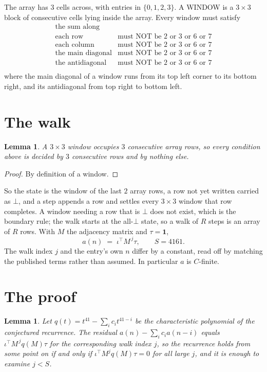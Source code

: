 \documentclass[11pt,a4paper]{article}
\theoremstyle{plain}
\newtheorem{lemma}[theorem]{Lemma}
\theoremstyle{definition}
\begin{document}
The array has $3$ cells across, with entries in $\{0,1,2,3\}$. A WINDOW is a $3\times3$ block
of consecutive cells lying inside the array. Every window must satisfy
\[
\begin{array}{ll}
\text{the sum along} & \text{} \\[2pt]
\text{each row} & \text{must NOT be 2 or 3 or 6 or 7} \\
\text{each column} & \text{must NOT be 2 or 3 or 6 or 7} \\
\text{the main diagonal} & \text{must NOT be 2 or 3 or 6 or 7} \\
\text{the antidiagonal} & \text{must NOT be 2 or 3 or 6 or 7} \\
\end{array}
\]
where the main diagonal of a window runs from its top left corner to its bottom right, and its
antidiagonal from top right to bottom left.

\section{The walk}

\begin{lemma}\label{lem:win}
A $3\times3$ window occupies $3$ consecutive array rows, so every condition above is
decided by $3$ consecutive rows and by nothing else.
\end{lemma}

\begin{proof}
By definition of a window.
\end{proof}

So the state is the window of the last $2$ array rows, a row not yet written carried as
$\bot$, and a step appends a row and settles every $3\times3$ window that row completes. A
window needing a row that is $\bot$ does not exist, which is the boundary rule; the walk starts
at the all-$\bot$ state, so a walk of $R$ steps is an array of $R$ rows. With $M$ the adjacency
matrix and $\tau=\mathbf{1}$,
\[
a(n)\;=\;\iota^{\!\top}M^{\,j}\tau ,\qquad S=4161.
\]
The walk index $j$ and the entry's own $n$ differ by a constant, read off by matching the
published terms rather than assumed. In particular $a$ is $C$-finite.

\section{The proof}

\begin{lemma}\label{lem:crit}
Let $q(t)=t^{41}-\sum_i c_it^{41-i}$ be the characteristic polynomial of the
conjectured recurrence. The residual $a(n)-\sum_ic_ia(n-i)$ equals
$\iota^{\!\top}M^{\,j}q(M)\tau$ for the corresponding walk index $j$, so the recurrence
holds from some point on if and only if $\iota^{\!\top}M^{j}q(M)\tau=0$ for all large $j$,
and it is enough to examine $j<S$.
\end{lemma}
\end{document}
